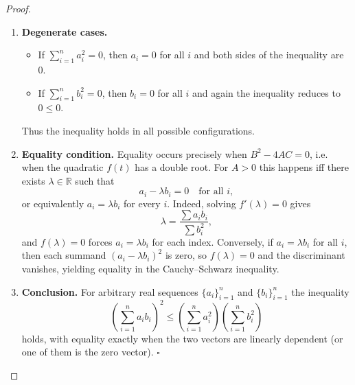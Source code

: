 \begin{proof}
\begin{enumerate}
\item \textbf{Degenerate cases.}
\begin{itemize}
\item If $\displaystyle\sum_{i=1}^{n}a_{i}^{2}=0$, then $a_{i}=0$ for all $i$ and both sides of the inequality are $0$.
\item If $\displaystyle\sum_{i=1}^{n}b_{i}^{2}=0$, then $b_{i}=0$ for all $i$ and again the inequality reduces to $0\le0$.
\end{itemize}
Thus the inequality holds in all possible configurations.

\item \textbf{Equality condition.}  
Equality occurs precisely when $B^{2}-4AC=0$, i.e. when the quadratic $f(t)$ has a double root. For $A>0$ this happens iff there exists $\lambda\in\mathbb R$ such that
\[
a_{i}-\lambda b_{i}=0\quad\text{for all }i,
\]
or equivalently $a_{i}=\lambda b_{i}$ for every $i$. Indeed, solving $f'(\lambda)=0$ gives
\[
\lambda=\frac{\sum a_{i}b_{i}}{\sum b_{i}^{2}},
\]
and $f(\lambda)=0$ forces $a_{i}=\lambda b_{i}$ for each index. Conversely, if $a_{i}=\lambda b_{i}$ for all $i$, then each summand $(a_{i}-\lambda b_{i})^{2}$ is zero, so $f(\lambda)=0$ and the discriminant vanishes, yielding equality in the Cauchy–Schwarz inequality.

\item \textbf{Conclusion.}  
For arbitrary real sequences $\{a_i\}_{i=1}^{n}$ and $\{b_i\}_{i=1}^{n}$ the inequality
\[
\left(\sum_{i=1}^{n} a_{i}b_{i}\right)^{2}
\le
\left(\sum_{i=1}^{n} a_{i}^{2}\right)
\left(\sum_{i=1}^{n} b_{i}^{2}\right)
\]
holds, with equality exactly when the two vectors are linearly dependent (or one of them is the zero vector). \(\square\)
\end{enumerate}
\end{proof}